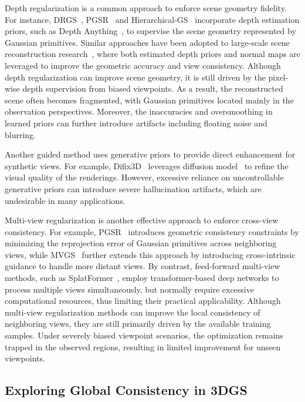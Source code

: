 \documentclass[lettersize,journal]{IEEEtran}
\begin{document}
Depth regularization is a common approach to enforce scene geometry fidelity. For instance, DRGS~\cite{drgs}, PGSR~\cite{pgsr} and Hierarchical-GS~\cite{hierarchical} incorporate depth estimation priors, such as Depth Anything~\cite{dav2}, to supervise the scene geometry represented by Gaussian primitives. Similar approaches have been adopted to large-scale scene reconstruction research~\cite{hierarchical,citygaussian}, where both estimated depth priors and normal maps are leveraged to improve the geometric accuracy and view consistency. 
Although depth regularization can improve scene geometry, it is still 
driven by the pixel-wise depth supervision from biased viewpoints. 
As a result, the reconstructed scene often becomes fragmented, 
with Gaussian primitives located mainly in the observation perspectives. 
Moreover, the inaccuracies and oversmoothing in learned priors can further introduce artifacts including floating noise and blurring.

Another guided method uses generative priors to provide direct enhancement for synthetic views. For example, Difix3D~\cite{difix3d+} leverages diffusion model~\cite{diffusion} to refine the visual quality of the renderings. 
However, excessive reliance on uncontrollable generative priors can introduce severe hallucination artifacts, which are undesirable in many applications.

Multi-view regularization is another effective approach to enforce cross-view consistency. For example, 
PGSR~\cite{pgsr} introduces geometric consistency constraints by minimizing the reprojection error of Gaussian primitives across neighboring views, 
while MVGS~\cite{mvgs} further extends this approach by introducing cross-intrinsic guidance to 
handle more distant views. 
By contrast, feed-forward multi-view methods, such as SplatFormer~\cite{splatformer}, employ transformer-based deep networks to process multiple views simultaneously, but normally require excessive computational resources, thus limiting their practical applicability.
Although multi-view regularization methods can improve the local consistency of neighboring views, they are still primarily driven by the available training samples. Under severely biased viewpoint scenarios, the optimization remains trapped in the observed regions, resulting in limited improvement for unseen viewpoints. 


\subsection{Exploring Global Consistency in 3DGS}
\end{document}
